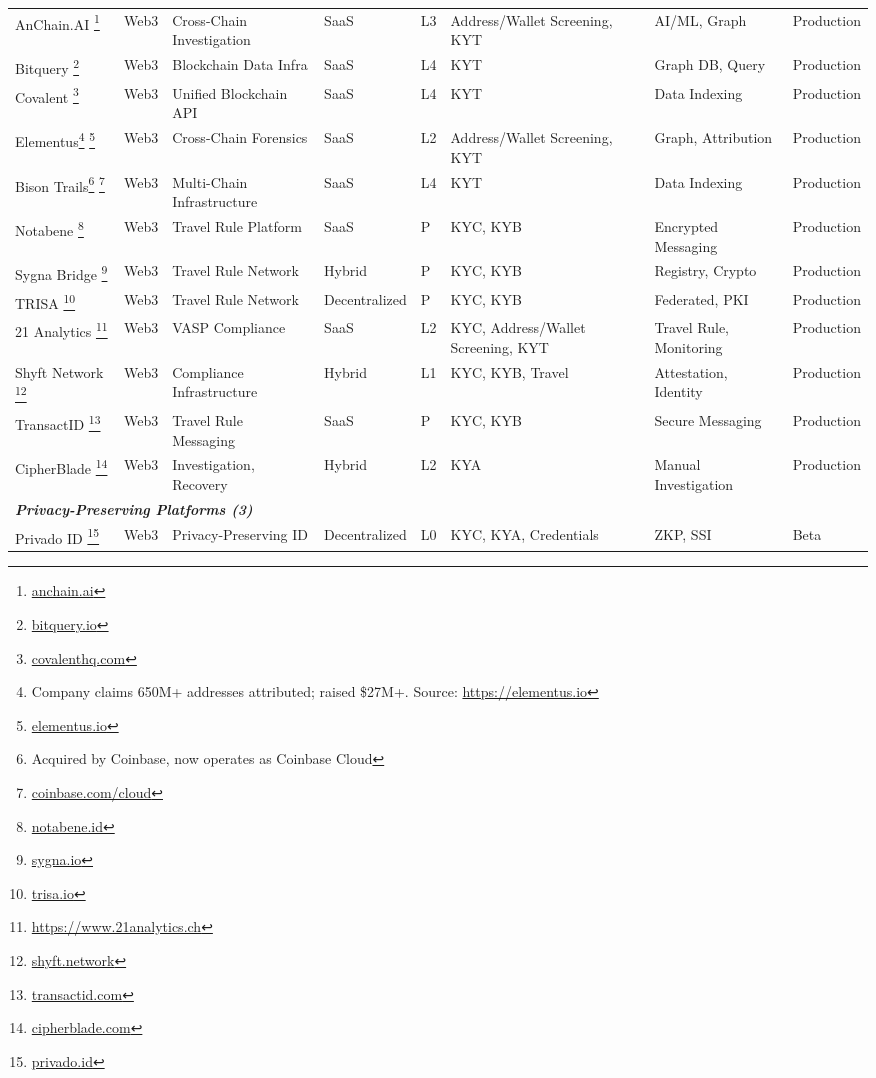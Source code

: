 \begin{table}[htbp]
\begin{tabularx}{\textwidth}{p{1.5cm}p{0.9cm}X p{1.1cm}p{1.2cm}p{1.1cm}X p{0.9cm}}
\hline
AnChain.AI \footnote{\url{anchain.ai}} & Web3 & Cross-Chain Investigation & SaaS & L3 & Address/Wallet Screening, KYT & AI/ML, Graph & Production \\
Bitquery \footnote{\url{bitquery.io}} & Web3 & Blockchain Data Infra & SaaS & L4 & KYT & Graph DB, Query & Production \\
Covalent \footnote{\url{covalenthq.com}} & Web3 & Unified Blockchain API & SaaS & L4 & KYT & Data Indexing & Production \\
Elementus\footnote{Company claims 650M+ addresses attributed; raised \$27M+. Source: \url{https://elementus.io}} \footnote{\url{elementus.io}} & Web3 & Cross-Chain Forensics & SaaS & L2 & Address/Wallet Screening, KYT & Graph, Attribution & Production \\
Bison Trails\footnote{Acquired by Coinbase, now operates as Coinbase Cloud} \footnote{\url{coinbase.com/cloud}} & Web3 & Multi-Chain Infrastructure & SaaS & L4 & KYT & Data Indexing & Production \\
Notabene \footnote{\url{notabene.id}} & Web3 & Travel Rule Platform & SaaS & P & KYC, KYB & Encrypted Messaging & Production \\
Sygna Bridge \footnote{\url{sygna.io}} & Web3 & Travel Rule Network & Hybrid & P & KYC, KYB & Registry, Crypto & Production \\
TRISA \footnote{\url{trisa.io}} & Web3 & Travel Rule Network & Decentralized & P & KYC, KYB & Federated, PKI & Production \\
21 Analytics \footnote{\url{https://www.21analytics.ch}} & Web3 & VASP Compliance & SaaS & L2 & KYC, Address/Wallet Screening, KYT & Travel Rule, Monitoring & Production \\
Shyft Network \footnote{\url{shyft.network}} & Web3 & Compliance Infrastructure & Hybrid & L1 & KYC, KYB, Travel & Attestation, Identity & Production \\
TransactID \footnote{\url{transactid.com}} & Web3 & Travel Rule Messaging & SaaS & P & KYC, KYB & Secure Messaging & Production \\
CipherBlade \footnote{\url{cipherblade.com}} & Web3 & Investigation, Recovery & Hybrid & L2 & KYA & Manual Investigation & Production \\
\hline
\multicolumn{8}{l}{\textit{\textbf{Privacy-Preserving Platforms (3)}}} \\
\hline
Privado ID \footnote{\url{privado.id}} & Web3 & Privacy-Preserving ID & Decentralized & L0 & KYC, KYA, Credentials & ZKP, SSI & Beta \\

\end{tabularx}
\end{table}
